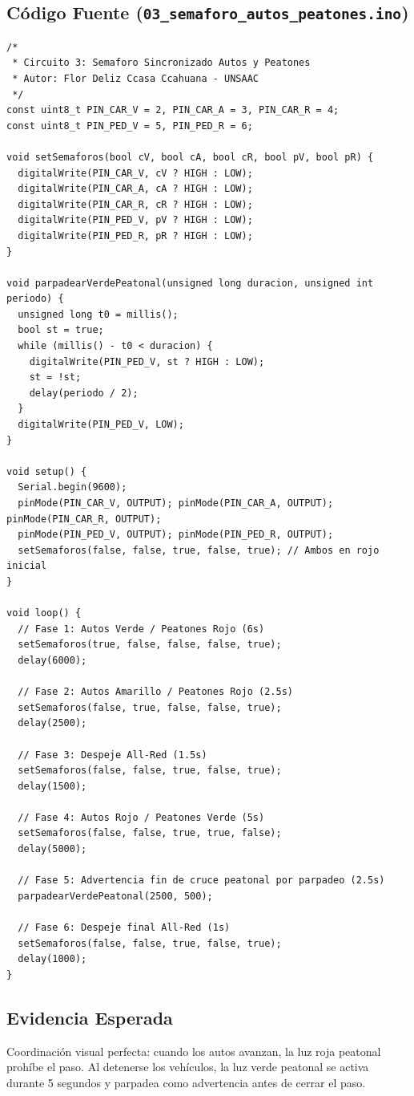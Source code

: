 \documentclass[12pt,a4paper]{article}
\begin{document}
\subsection{Código Fuente (\texttt{03\_semaforo\_autos\_peatones.ino})}
\begin{lstlisting}
/*
 * Circuito 3: Semaforo Sincronizado Autos y Peatones
 * Autor: Flor Deliz Ccasa Ccahuana - UNSAAC
 */
const uint8_t PIN_CAR_V = 2, PIN_CAR_A = 3, PIN_CAR_R = 4;
const uint8_t PIN_PED_V = 5, PIN_PED_R = 6;

void setSemaforos(bool cV, bool cA, bool cR, bool pV, bool pR) {
  digitalWrite(PIN_CAR_V, cV ? HIGH : LOW);
  digitalWrite(PIN_CAR_A, cA ? HIGH : LOW);
  digitalWrite(PIN_CAR_R, cR ? HIGH : LOW);
  digitalWrite(PIN_PED_V, pV ? HIGH : LOW);
  digitalWrite(PIN_PED_R, pR ? HIGH : LOW);
}

void parpadearVerdePeatonal(unsigned long duracion, unsigned int periodo) {
  unsigned long t0 = millis();
  bool st = true;
  while (millis() - t0 < duracion) {
    digitalWrite(PIN_PED_V, st ? HIGH : LOW);
    st = !st;
    delay(periodo / 2);
  }
  digitalWrite(PIN_PED_V, LOW);
}

void setup() {
  Serial.begin(9600);
  pinMode(PIN_CAR_V, OUTPUT); pinMode(PIN_CAR_A, OUTPUT); pinMode(PIN_CAR_R, OUTPUT);
  pinMode(PIN_PED_V, OUTPUT); pinMode(PIN_PED_R, OUTPUT);
  setSemaforos(false, false, true, false, true); // Ambos en rojo inicial
}

void loop() {
  // Fase 1: Autos Verde / Peatones Rojo (6s)
  setSemaforos(true, false, false, false, true);
  delay(6000);

  // Fase 2: Autos Amarillo / Peatones Rojo (2.5s)
  setSemaforos(false, true, false, false, true);
  delay(2500);

  // Fase 3: Despeje All-Red (1.5s)
  setSemaforos(false, false, true, false, true);
  delay(1500);

  // Fase 4: Autos Rojo / Peatones Verde (5s)
  setSemaforos(false, false, true, true, false);
  delay(5000);

  // Fase 5: Advertencia fin de cruce peatonal por parpadeo (2.5s)
  parpadearVerdePeatonal(2500, 500);

  // Fase 6: Despeje final All-Red (1s)
  setSemaforos(false, false, true, false, true);
  delay(1000);
}
\end{lstlisting}

\subsection{Evidencia Esperada}
Coordinación visual perfecta: cuando los autos avanzan, la luz roja peatonal prohíbe el paso. Al detenerse los vehículos, la luz verde peatonal se activa durante 5 segundos y parpadea como advertencia antes de cerrar el paso.
\end{document}
